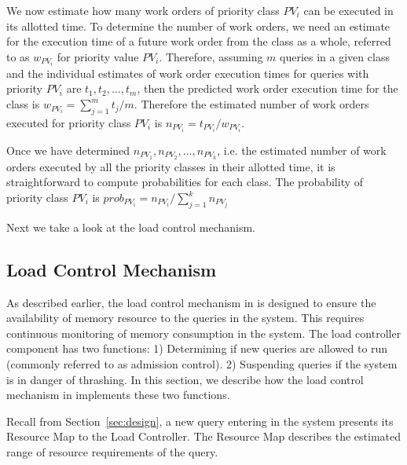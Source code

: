 We now estimate how many work orders of priority class $PV_{i}$ can be executed
in its allotted time. 
To determine the number of work orders, we need an estimate for the execution time 
of a future work order from the class as a whole, referred to as $w_{PV_{i}}$ for priority value $PV_{i}$.
Therefore, assuming $m$ queries in a given class and the individual estimates of 
work order execution times for queries with priority $PV_{i}$ are $t_{1}, t_{2}, \ldots, t_{m}$, then the predicted work order execution time for the class is $w_{PV_{i}} = \sum\limits_{j = 1}^{m}t_{j}/m$.
Therefore the estimated number of work orders executed for priority class $PV_{i}$ is
$n_{PV_{i}} = t_{PV_{i}} / w_{PV_{i}}$.

Once we have determined $n_{PV_{1}}, n_{PV_{2}}, \ldots, n_{PV_{k}}$, i.e. the 
estimated number of work orders executed by all the priority classes in their allotted
time, it is straightforward to compute probabilities for each class. 
The probability of priority class $PV_{i}$ is 
$prob_{PV_{i}} = n_{PV_{i}}/\sum\limits_{j = 1}^{k}n_{PV_{j}}$

Next we take a look at the load control mechanism. %
\subsection{Load Control Mechanism}\label{ssec:load-control-mech}
As described earlier, the load control mechanism in \sys{} is designed to ensure the availability of memory resource to the queries in the system.
This requires continuous monitoring of memory consumption in the system.
The load controller component has two functions:
1) Determining if new queries are allowed to run (commonly referred to as admission control).
2) Suspending queries if the system is in danger of thrashing.
In this section, we describe how the load control mechanism in \sys{} implements these two functions.

Recall from Section~\ref{sec:design}, a new query entering in the system presents its Resource Map to the Load Controller. 
The Resource Map describes the estimated range of resource requirements of the query.


